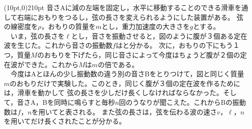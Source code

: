 \hakosyokika
\item
    \begin{mawarikomi}(10pt,0){210pt}{}
    音さAに減の左端を固定し，水平に移動することのできる滑車を通して右端におもりをつるし，弦の長さを変えられるようにした装置がある。
    弦の線密度を$\rho $，おもりの質量を$m$とし，重力加速度の大きさを$g$とする。\\
    ~~いま，弦の長さを$\ell $とし，音さを振動させると，図のように腹が３個ある定在波を生じた。これから音さの振動数$f$は\Hako と分かる。
    次に，おもりの下にもう１つ，質量$M$のおもりを下げたら，同じ音さによって今度はちょうど腹が２個の定在波ができた。これから$M$は$m$の\Hako 倍である。\\
    ~~今度はAとほんの少し振動数の違う別の音さBをとりつけて，図と同じく質量$m$のおもりだけで実験した。このとき，同じく腹が３個の定在波を作るためには，滑車を動かして
    弦の長さを少しだけ長くしなければならなかった。そして，音さA，Bを同時に鳴らすと毎秒$n$回のうなりが聞こえた。これからBの振動数は$f$，$n$を用いて\Hako と表される。
    また弦の長さは，弦を伝わる波の速さ$v$，$\ell $，$n$を用いて\Hako だけ長くされたことが分かる。
    \end{mawarikomi}